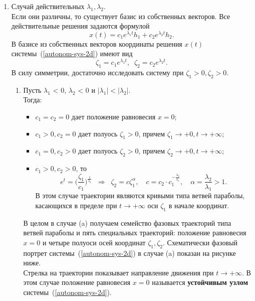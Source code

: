 \begin{enumerate}
    \item Случай действительных $\lambda_1, \lambda_2$.\\
        Если они различны, то существует базис из собственных векторов. Все действительные решения задаются формулой
        \[x(t) = c_1 e^{\lambda_1 t} h_1 + c_2 e^{\lambda_2 t} h_2.\] В базисе из собственных векторов координаты решения \(x(t)\) системы~(\ref{autonom-sys-2d}) имеют вид
        \[\zeta_1 = c_1 e^{\lambda_1 t},\;\; \zeta_2 =  c_2 e^{\lambda_2 t}.\] В силу симметрии, достаточно исследовать систему при $\zeta_1 > 0, \zeta_2 > 0.$
        \begin{enumerate}
        \item Пусть $\lambda_1$ < 0, $\lambda_2$ < 0 и $|\lambda_1| < |\lambda_2|$.\\
        Тогда:
        \begin{itemize}
        \item $c_1 = c_2 = 0$ дает положение равновесия $x = 0$;
        \item $c_1 >0, c_2 = 0$ дает полуось $\zeta_1 > 0$, причем $\zeta_1 \longrightarrow +0, t \longrightarrow +\infty$;
        \item $c_1 = 0, c_2 > 0$ дает полуось $\zeta_2 > 0$, причем $\zeta_2 \longrightarrow +0, t \longrightarrow +\infty$;
        \item $c_1 > 0, c_2 > 0$, то 
        \[e^t = \Big(\frac{\zeta_1}{c_1}\Big)^{\frac{1}{\lambda_1}} \;\; \Rightarrow \;\; \zeta_2 = c \zeta_1^{\alpha}, \quad c = c_2 \cdot c_1^{-\frac{\lambda_2}{\lambda_1}}, \quad \alpha = \frac{\lambda_2}{\lambda_1} > 1.\]
        В этом случае траектории являются кривыми типа ветвей параболы, касающихся в пределе при $t \longrightarrow +\infty$ оси $\zeta_1$ в начале координат.
        \end{itemize}
        В целом в случае (a) получаем семейство фазовых траекторий типа ветвей параболы и пять специальных траекторий: положение равновесия $x = 0$ и четыре полуоси осей координат $\zeta_1, \zeta_2$. Схематически фазовый портрет системы~(\ref{autonom-sys-2d}) в случае (a) показан на рисунке ниже.\\
        Стрелка на траектории показывает направление движения при $t \longrightarrow +\infty$.
        В этом случае положение равновесия $x = 0$ называется \textbf{устойчивым узлом} системы~(\ref{autonom-sys-2d}).
        

\end{enumerate}
\end{enumerate}
